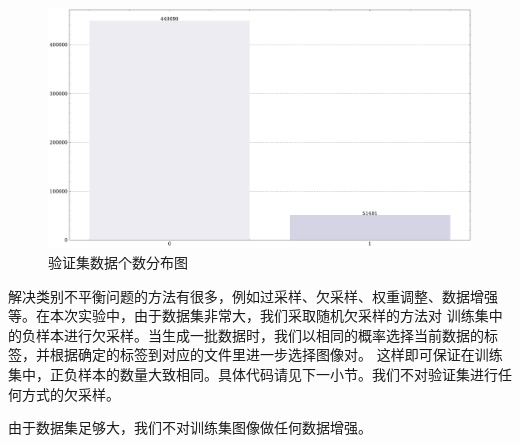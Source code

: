 \documentclass[supercite]{Experimental_Report}
\theoremstyle{definition}
\begin{document}
\begin{figure}[H]
	\begin{center}
		\includegraphics[scale=0.4]{../images/验证集数据个数分布图.pdf}
		\caption{验证集数据个数分布图}
		\label{验证集数据个数分布图}
	\end{center}
\end{figure}

解决类别不平衡问题的方法有很多，例如过采样、欠采样、权重调整、数据增强等。在本次实验中，由于数据集非常大，我们采取随机欠采样的方法对
训练集中的负样本进行欠采样。当生成一批数据时，我们以相同的概率选择当前数据的标签，并根据确定的标签到对应的文件里进一步选择图像对。
这样即可保证在训练集中，正负样本的数量大致相同。具体代码请见下一小节。我们不对验证集进行任何方式的欠采样。

由于数据集足够大，我们不对训练集图像做任何数据增强。
\end{document}
